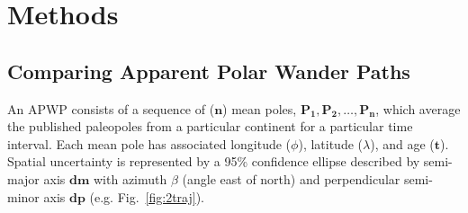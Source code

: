 \section{Methods}

\subsection{Comparing Apparent Polar Wander Paths}

An APWP consists of a sequence of ($\mathbf{n}$) mean poles,
$\mathbf{P_1,P_2,\ldots,P_n}$, which average the published paleopoles from a
particular continent for a particular time interval. Each mean pole has
associated longitude ($\phi$), latitude ($\lambda$), and age ($\mathbf{t}$).
Spatial uncertainty is represented by a 95\% confidence ellipse described by
semi-major axis $\mathbf{dm}$ with azimuth $\beta$ (angle east of north) and
perpendicular semi-minor axis $\mathbf{dp}$ (e.g. Fig.~\ref{fig:2traj}).

